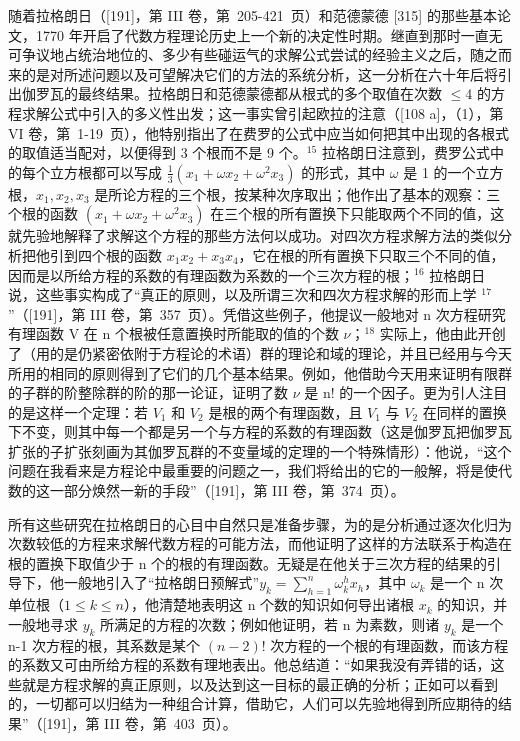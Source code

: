 随着拉格朗日（{[}191{]}，第 III 卷，第~205-421~页）和范德蒙德 {[}315{]} 的那些基本论文，1770 年开启了代数方程理论历史上一个新的决定性时期。继直到那时一直无可争议地占统治地位的、多少有些碰运气的求解公式尝试的经验主义之后，随之而来的是对所述问题以及可望解决它们的方法的系统分析，这一分析在六十年后将引出伽罗瓦的最终结果。拉格朗日和范德蒙德都从根式的多个取值在次数 \(\leq 4\) 的方程求解公式中引入的多义性出发；这一事实曾引起欧拉的注意（{[}108 a{]}，（1），第 VI 卷，第~1-19~页），他特别指出了在费罗的公式中应当如何把其中出现的各根式的取值适当配对，以便得到 3 个根而不是 9 个。\(^{15}\) 拉格朗日注意到，费罗公式中的每个立方根都可以写成 \(\frac{1}{3}(x_1 + \omega x_2 + \omega^2 x_3)\) 的形式，其中 \(\omega\) 是 1 的一个立方根，\(x_1, x_2, x_3\) 是所论方程的三个根，按某种次序取出；他作出了基本的观察：三个根的函数 \((x_1 + \omega x_2 + \omega^2 x_3)\) 在三个根的所有置换下只能取两个不同的值，这就先验地解释了求解这个方程的那些方法何以成功。对四次方程求解方法的类似分析把他引到四个根的函数 \(x_{1}x_{2} + x_{3}x_{4}\)，它在根的所有置换下只取三个不同的值，因而是以所给方程的系数的有理函数为系数的一个三次方程的根；\(^{16}\) 拉格朗日说，这些事实构成了“真正的原则，以及所谓三次和四次方程求解的形而上学 \(^{17}\)”（{[}191{]}，第 III 卷，第~357~页）。凭借这些例子，他提议一般地对 n 次方程研究有理函数 V 在 n 个根被任意置换时所能取的值的个数 \(\nu\)；\(^{18}\) 实际上，他由此开创了（用的是仍紧密依附于方程论的术语）群的理论和域的理论，并且已经用与今天所用的相同的原则得到了它们的几个基本结果。例如，他借助今天用来证明有限群的子群的阶整除群的阶的那一论证，证明了数 \(\nu\) 是 n! 的一个因子。更为引人注目的是这样一个定理：若 \(V_{1}\) 和 \(V_{2}\) 是根的两个有理函数，且 \(V_{1}\) 与 \(V_{2}\) 在同样的置换下不变，则其中每一个都是另一个与方程的系数的有理函数（这是伽罗瓦把伽罗瓦扩张的子扩张刻画为其伽罗瓦群的不变量域的定理的一个特殊情形）：他说，“这个问题在我看来是方程论中最重要的问题之一，我们将给出的它的一般解，将是使代数的这一部分焕然一新的手段”（{[}191{]}，第 III 卷，第~374~页）。

所有这些研究在拉格朗日的心目中自然只是准备步骤，为的是分析通过逐次化归为次数较低的方程来求解代数方程的可能方法，而他证明了这样的方法联系于构造在根的置换下取值少于 n 个的根的有理函数。无疑是在他关于三次方程的结果的引导下，他一般地引入了“拉格朗日预解式”\(y_{k} = \sum_{h=1}^{n} \omega_{k}^{h} x_{h}\)，其中 \(\omega_{k}\) 是一个 n 次单位根（\(1 \leq k \leq n\)），他清楚地表明这 n 个数的知识如何导出诸根 \(x_{k}\) 的知识，并一般地寻求 \(y_{k}\) 所满足的方程的次数；例如他证明，若 n 为素数，则诸 \(y_{k}\) 是一个 n-1 次方程的根，其系数是某个 \((n-2)!\) 次方程的一个根的有理函数，而该方程的系数又可由所给方程的系数有理地表出。他总结道：“如果我没有弄错的话，这些就是方程求解的真正原则，以及达到这一目标的最正确的分析；正如可以看到的，一切都可以归结为一种组合计算，借助它，人们可以先验地得到所应期待的结果”（{[}191{]}，第 III 卷，第~403~页）。

